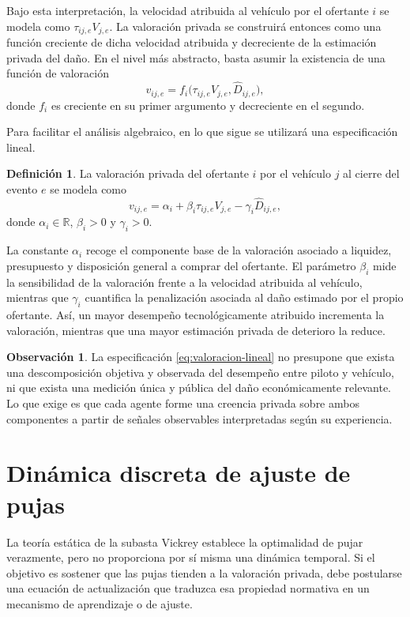 \documentclass[11pt,a4paper]{article}
\theoremstyle{definition}
\newtheorem{definicion}{Definición}
\newtheorem{observacion}{Observación}
\begin{document}
Bajo esta interpretación, la velocidad atribuida al vehículo por el ofertante $i$ se modela como $\tau_{ij,e}V_{j,e}$. La valoración privada se construirá entonces como una función creciente de dicha velocidad atribuida y decreciente de la estimación privada del daño. En el nivel más abstracto, basta asumir la existencia de una función de valoración
\[
v_{ij,e}=f_i\big(\tau_{ij,e}V_{j,e},\widehat D_{ij,e}\big),
\]
donde $f_i$ es creciente en su primer argumento y decreciente en el segundo.

Para facilitar el análisis algebraico, en lo que sigue se utilizará una especificación lineal.

\begin{definicion}
La valoración privada del ofertante $i$ por el vehículo $j$ al cierre del evento $e$ se modela como
\begin{equation}\label{eq:valoracion-lineal}
v_{ij,e}=\alpha_i+\beta_i\tau_{ij,e}V_{j,e}-\gamma_i \widehat D_{ij,e},
\end{equation}
donde $\alpha_i\in\mathbb{R}$, $\beta_i>0$ y $\gamma_i>0$.
\end{definicion}

La constante $\alpha_i$ recoge el componente base de la valoración asociado a liquidez, presupuesto y disposición general a comprar del ofertante. El parámetro $\beta_i$ mide la sensibilidad de la valoración frente a la velocidad atribuida al vehículo, mientras que $\gamma_i$ cuantifica la penalización asociada al daño estimado por el propio ofertante. Así, un mayor desempeño tecnológicamente atribuido incrementa la valoración, mientras que una mayor estimación privada de deterioro la reduce.

\begin{observacion}
La especificación \eqref{eq:valoracion-lineal} no presupone que exista una descomposición objetiva y observada del desempeño entre piloto y vehículo, ni que exista una medición única y pública del daño económicamente relevante. Lo que exige es que cada agente forme una creencia privada sobre ambos componentes a partir de señales observables interpretadas según su experiencia.
\end{observacion}

\section{Dinámica discreta de ajuste de pujas}

La teoría estática de la subasta Vickrey establece la optimalidad de pujar verazmente, pero no proporciona por sí misma una dinámica temporal. Si el objetivo es sostener que las pujas tienden a la valoración privada, debe postularse una ecuación de actualización que traduzca esa propiedad normativa en un mecanismo de aprendizaje o de ajuste.
\end{document}
